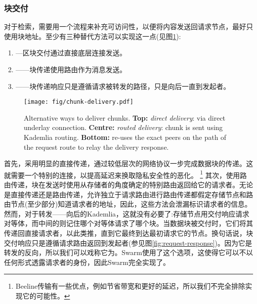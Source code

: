 \subsubsection{块交付}

对于检索，需要用一个流程来补充可访问性，以便将内容发送回请求节点，最好只使用块地址。至少有三种替代方法可以实现这一点(见图\ref{fig:chunk-delivery}):

\begin{enumerate}
    \item {}—区块交付通过直接底层连接发送。 
    \item {}——块传递使用路由作为消息发送。
    \item {}——块传递响应只是遵循请求被转发的路径，只是向后一直到发起者。
\end{enumerate}


\begin{figure}[htbp]
   \centering
   \texttt{[image: fig/chunk-delivery.pdf]}
   \caption[Alternative ways to deliver chunks: direct, routed and backward \statusgreen]{Alternative ways to deliver chunks. \textbf{Top:} \emph{direct delivery}: via direct underlay connection. \textbf{Centre:} \emph{routed delivery}: chunk is sent using Kademlia routing. \textbf{Bottom:}  re-uses the exact peers on the path of the request route to relay the delivery response.}
   \label{fig:chunk-delivery}
\end{figure}

首先，采用明显的直接传递，通过较低层次的网络协议一步完成数据块的传递。这就需要一个特别的连接，以提高延迟来换取隐私安全性的恶化。%
%
\footnote{Beeline传输有一些优点，例如节省带宽和更好的延迟，所以我们不完全排除实现它的可能性。 
}
其次，使用路由传递，块在发送时使用从存储者的角度确定的特别路由返回给它的请求者。无论是直接传递还是路由传递，允许独立于请求路由进行路由传递都假定存储节点和路由节点(至少部分)知道请求者的地址，因此，这些方法会泄漏标识请求者的信息。然而，对于转发——向后的Kademlia，这就没有必要了:存储节点用交付响应请求对等体，而中间的则记住哪个对等体请求了哪个块。当数据块被交付时，它们将其传递回直接请求者，以此类推，直到它最终到达最初请求它的节点。换句话说，块交付响应只是遵循请求路由返回到发起者(参见图\ref{fig:request-response})。因为它是转发的反向，所以我们可以戏称它为。Swarm使用了这个选项，这使得它可以不以任何形式透露请求者的身份，因此Swarm完全实现了。 

